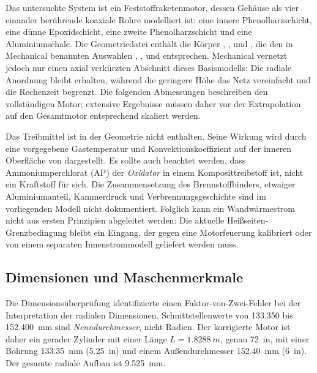 \documentclass[oneside,openany]{amsdtx}
\begin{document}
Das untersuchte System ist ein Feststoffraketenmotor, dessen Gehäuse als vier einander berührende koaxiale Rohre modelliert ist: eine innere Phenolharzschicht, eine dünne Epoxidschicht, eine zweite Phenolharzschicht und eine Aluminiumschale. Die Geometriedatei enthält die Körper , ,  und , die den in Mechanical benannten Auswahlen , ,  und  entsprechen. Mechanical vernetzt jedoch nur einen axial verkürzten Abschnitt dieses Basismodells: Die radiale Anordnung bleibt erhalten, während die geringere Höhe das Netz vereinfacht und die Rechenzeit begrenzt. Die folgenden Abmessungen beschreiben den vollständigen Motor; extensive Ergebnisse müssen daher vor der Extrapolation auf den Gesamtmotor entsprechend skaliert werden.

Das Treibmittel ist in der Geometrie nicht enthalten. Seine Wirkung wird durch eine vorgegebene Gastemperatur und Konvektionskoeffizient auf der inneren Oberfläche von  dargestellt. Es sollte auch beachtet werden, dass Ammoniumperchlorat (AP) der \emph{ Oxidator} in einem Komposittreibstoff ist, nicht ein Kraftstoff für sich. Die Zusammensetzung des Brennstoffbinders, etwaiger Aluminiumanteil, Kammerdruck und Verbrennungsgeschichte sind im vorliegenden Modell nicht dokumentiert. Folglich kann ein Wandwärmestrom nicht aus ersten Prinzipien abgeleitet werden: Die aktuelle Heißseiten-Grenzbedingung bleibt ein Eingang, der gegen eine Motorfeuerung kalibriert oder von einem separaten Innenstrommodell geliefert werden muss.

\subsection{Dimensionen und Maschenmerkmale}

Die Dimensionsüberprüfung identifizierte einen Faktor-von-Zwei-Fehler bei der Interpretation der radialen Dimensionen. Schnittstellenwerte von 133.350 bis \SI{152.400}{mm} sind \emph{ Nenndurchmesser}, nicht Radien. Der korrigierte Motor ist daher ein gerader Zylinder mit einer Länge \(L=\SI{1.8288}{m}\), genau \SI{72}{in}, mit einer Bohrung \SI{133.35}{mm} (\SI{5.25}{in}) und einem Außendurchmesser \SI{152.40}{mm} (\SI{6}{in}). Der gesamte radiale Aufbau ist \SI{9.525}{mm}.

\begin{center}
\end{center}
\end{document}
